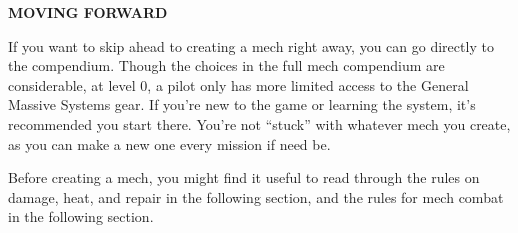 \begin{center}
 \textbf{MOVING FORWARD}     
\end{center}

If you want to skip ahead to creating a mech right away, you can go directly to the compendium. Though the choices in the full mech compendium are considerable, at level 0, a pilot only has more limited access to the General Massive Systems gear. If you're new to the game or learning the system, it's recommended you start there. You're not ``stuck'' with whatever mech you create, as you can make a new one every mission if need be.

Before creating a mech, you might find it useful to read through the rules on damage, heat, and repair in the following section, and the rules for mech combat in the following section.

